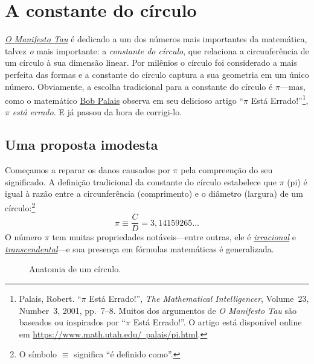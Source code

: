\section{A constante do círculo} %
\label{sec:the_circle_constant}

\href{https://tauday.com/tau-manifesto}{\emph{O Manifesto Tau}} é dedicado a um dos números mais importantes da matemática, talvez \emph{o} mais importante: a \emph{constante do círculo}, que relaciona a circunferência de um círculo à sua dimensão linear. Por milênios o círculo foi considerado a mais perfeita das formas e a constante do círculo captura a sua geometria em um único número. Obviamente, a escolha tradicional para a constante do círculo é $\pi$---mas, como o matemático \href{https://www.math.utah.edu/~palais/}{Bob Palais} observa em seu delicioso artigo ``$\pi$ Está Errado!''\footnote{Palais, Robert. ``$\pi$ Está Errado!'', \emph{The Mathematical Intelligencer}, Volume~23, Number~3, 2001, pp.~7--8. Muitos dos argumentos de \emph{O Manifesto Tau} são baseados ou inspirados por ``$\pi$ Está Errado!''. O artigo está disponível online em \href{https://www.math.utah.edu/~palais/pi.html}{https://www.math.utah.edu/~palais/pi.html}.}, $\pi$ \emph{está errado}. E já passou da hora de corrigi-lo.

  \subsection{Uma proposta imodesta} %
  \label{sec:an_immodest_proposal}

Começamos a reparar os danos causados por $\pi$ pela compreenção do seu significado. A definição tradicional da constante do círculo estabelece que $\pi$ (pi) é igual à razão entre a circunferência (comprimento) e o diâmetro (largura) de um círculo:\footnote{O símbolo $\equiv$ significa ``é definido como''.}
\begin{equation}
\label{eq:pi}
\pi \equiv \frac{C}{D} = 3,14159265\ldots
\end{equation}
O número $\pi$ tem muitas propriedades notáveis---entre outras, ele é \href{https://pt.wikipedia.org/wiki/N%C3%BAmero_irracional}{\emph{irracional}} e \href{https://pt.wikipedia.org/wiki/N%C3%BAmero_transcendente}{\emph{transcendental}}---e sua presença em fórmulas matemáticas é generalizada.

\begin{figure}
\caption{Anatomia de um círculo.\label{fig:circle}}
\end{figure}

